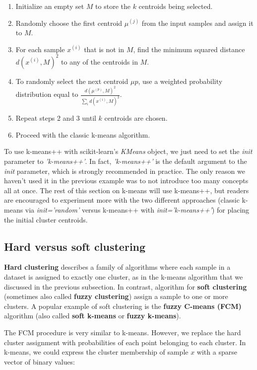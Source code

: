 \documentclass[11pt]{article}
\providecommand{\tightlist}{%
      \setlength{\itemsep}{0pt}\setlength{\parskip}{0pt}}
\begin{document}
\begin{enumerate}
\def\labelenumi{\arabic{enumi}.}
\tightlist
\item
  Initialize an empty set \(M\) to store the \(k\) centroids being
  selected.
\item
  Randomly choose the first centroid \(\mu^{(j)}\) from the input
  samples and assign it to \(M\).
\item
  For each sample \(x^{(i)}\) that is not in \(M\), find the minimum
  squared distance \(d(x^{(i)}, M)^2\) to any of the centroids in \(M\).
\item
  To randomly select the next centroid \(\mu{p}\), use a weighted
  probability distribution equal to
  \(\frac{d(\mu^{(p)}, M)^2}{\sum_i d(x^{(i)}, M)^2}\).
\item
  Repeat steps 2 and 3 until \(k\) centroids are chosen.
\item
  Proceed with the classic k-means algorithm.
\end{enumerate}

To use k-means++ with scikit-learn's \emph{KMeans} object, we just need
to set the \emph{init} parameter to \emph{'k-means++'}. In fact,
\emph{'k-means++'} is the default argument to the \emph{init} parameter,
which is strongly recommended in practice. The only reason we haven't
used it in the previous example was to not introduce too many concepts
all at once. The rest of this section on k-means will use k-means++, but
readers are encouraged to experiment more with the two different
approaches (classic k-means via \emph{init='random'} versus k-means++
with \emph{init='k-means++'}) for placing the initial cluster centroids.

    \subsection{Hard versus soft
clustering}\label{hard-versus-soft-clustering}

    \textbf{Hard clustering} describes a family of algorithms where each
sample in a dataset is assigned to exactly one cluster, as in the
k-means algorithm that we discussed in the previous subsection. In
contrast, algorithm for \textbf{soft clustering} (sometimes also called
\textbf{fuzzy clustering}) assign a sample to one or more clusters. A
popular example of soft clustering is the \textbf{fuzzy C-means (FCM)}
algorithm (also called \textbf{soft k-means} or \textbf{fuzzy k-means}).

The FCM procedure is very similar to k-means. However, we replace the
hard cluster assignment with probabilities of each point belonging to
each cluster. In k-means, we could express the cluster membership of
sample \(x\) with a sparse vector of binary values:
\end{document}
